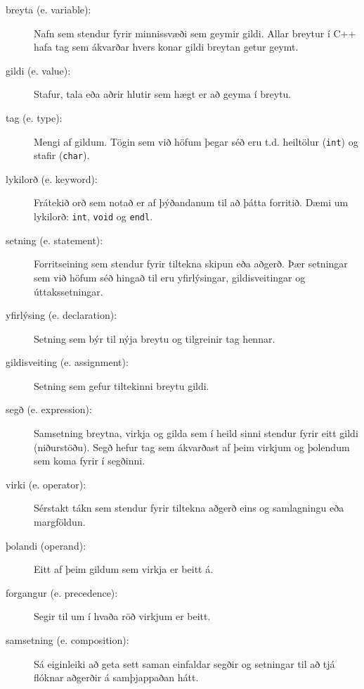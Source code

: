 \begin{description}

\item[breyta (e. variable):] Nafn sem stendur fyrir minnissvæði sem geymir gildi. 
Allar breytur í C++ hafa tag sem ákvarðar hvers konar gildi breytan getur geymt. 

\item[gildi (e. value):] Stafur, tala eða aðrir hlutir sem hægt er að geyma í breytu.

\item[tag (e. type):] Mengi af gildum. Tögin sem við höfum þegar séð eru t.d. heiltölur ({\tt int}) og stafir ({\tt char}).

\item[lykilorð (e. keyword):]  Frátekið orð sem notað er af þýðandanum til að þátta forritið.
Dæmi um lykilorð: {\tt int}, {\tt void} og {\tt endl}.

\item[setning (e. statement):] Forritseining sem stendur fyrir tiltekna skipun eða aðgerð.
Þær setningar sem við höfum séð hingað til eru yfirlýsingar, gildisveitingar og úttakssetningar.

\item[yfirlýsing (e. declaration):] Setning sem býr til nýja breytu og tilgreinir tag hennar.

\item[gildisveiting (e. assignment):] Setning sem gefur tiltekinni breytu gildi.

\item[segð (e. expression):] Samsetning breytna, virkja og gilda sem í heild sinni stendur fyrir eitt gildi (niðurstöðu).
Segð hefur tag sem ákvarðast af þeim virkjum og þolendum sem koma fyrir í segðinni. 

\item[virki (e. operator):] Sérstakt tákn sem stendur fyrir tiltekna aðgerð eins og samlagningu eða margföldun.

\item[þolandi (operand):] Eitt af þeim gildum sem virkja er beitt á. 

\item[forgangur (e. precedence):] Segir til um í hvaða röð virkjum er beitt. 

\item[samsetning (e. composition):] Sá eiginleiki að geta sett saman einfaldar segðir og setningar til að tjá flóknar aðgerðir á samþjappaðan hátt.


\end{description}
